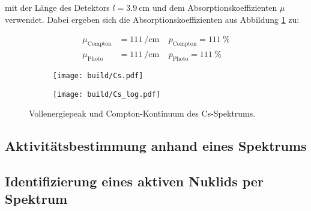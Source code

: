 mit der Länge des Detektors $l = \SI{3.9}{\centi\meter}$ und dem
Absorptionskoeffizienten $\mu$ verwendet. Dabei ergeben sich die
Absorptionskoeffizienten aus Abbildung \ref{plt:Cs_abs} zu:

\begin{align*}
  \mu_\text{Compton} &= \SI{111}{\per\centi\meter}\ \ \ \ \ p_\text{Compton} = \SI{111}{\percent} \\
  \mu_\text{Photo} &= \SI{111}{\per\centi\meter}\ \ \ \ \ p_\text{Photo} = \SI{111}{\percent}
\end{align*}

\begin{figure}
  \begin{subfigure}{0.5\textwidth}
    \centering
    \texttt{[image: build/Cs.pdf]}
  \end{subfigure}
  \begin{subfigure}{0.5\textwidth}
    \centering
    \texttt{[image: build/Cs\_log.pdf]}
  \end{subfigure}
  \caption{Vollenergiepeak und Compton-Kontinuum des Cs-Spektrums.}
  \label{plt:Cs_abs}
\end{figure}



\subsection{Aktivitätsbestimmung anhand eines Spektrums}
\label{sec:Aktivitätsbestimmung}

\subsection{Identifizierung eines aktiven Nuklids per Spektrum}
\label{sec:Nuklidbestimmung}



